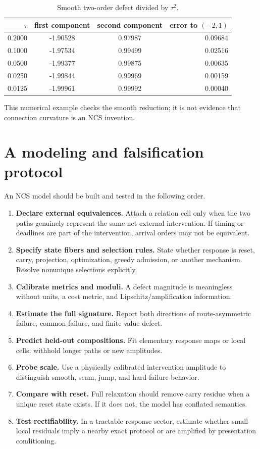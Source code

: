 \documentclass[11pt]{article}
\theoremstyle{definition}
\theoremstyle{remark}
\begin{document}
\begin{table}[ht]
\centering
\caption{Smooth two-order defect divided by \(\tau^2\).}
\label{tab:numerics}
\begin{tabular}{rccr}
\toprule
\(\tau\) & first component & second component &
error to \((-2,1)\) \\
\midrule
0.2000 & -1.90528 & 0.97987 & 0.09684 \\
0.1000 & -1.97534 & 0.99499 & 0.02516 \\
0.0500 & -1.99377 & 0.99875 & 0.00635 \\
0.0250 & -1.99844 & 0.99969 & 0.00159 \\
0.0125 & -1.99961 & 0.99992 & 0.00040 \\
\bottomrule
\end{tabular}
\end{table}

This numerical example checks the smooth reduction; it is not evidence that
connection curvature is an NCS invention.

\section{A modeling and falsification protocol}

An NCS model should be built and tested in the following order.

\begin{enumerate}
\item \textbf{Declare external equivalences.}
Attach a relation cell only when the two paths genuinely represent the same
net external intervention. If timing or deadlines are part of the
intervention, arrival orders may not be equivalent.
\item \textbf{Specify state fibers and selection rules.}
State whether response is reset, carry, projection, optimization, greedy
admission, or another mechanism. Resolve nonunique selections explicitly.
\item \textbf{Calibrate metrics and moduli.}
A defect magnitude is meaningless without units, a cost metric, and
Lipschitz/amplification information.
\item \textbf{Estimate the full signature.}
Report both directions of route-asymmetric failure, common failure, and finite
value defect.
\item \textbf{Predict held-out compositions.}
Fit elementary response maps or local cells; withhold longer paths or new
amplitudes.
\item \textbf{Probe scale.}
Use a physically calibrated intervention amplitude to distinguish smooth,
seam, jump, and hard-failure behavior.
\item \textbf{Compare with reset.}
Full relaxation should remove carry residue when a unique reset state exists.
If it does not, the model has conflated semantics.
\item \textbf{Test rectifiability.}
In a tractable response sector, estimate whether small local residuals imply a
nearby exact protocol or are amplified by presentation conditioning.
\end{enumerate}
\end{document}
